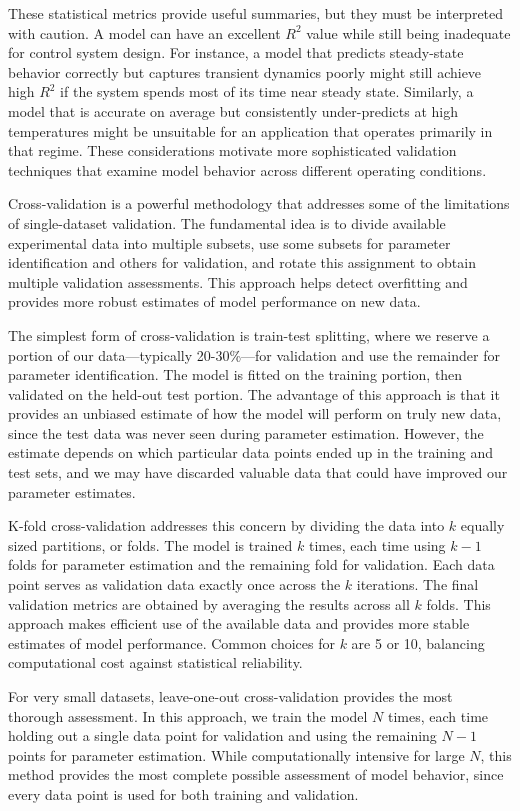 These statistical metrics provide useful summaries, but they must be interpreted with caution. A model can have an excellent $R^2$ value while still being inadequate for control system design. For instance, a model that predicts steady-state behavior correctly but captures transient dynamics poorly might still achieve high $R^2$ if the system spends most of its time near steady state. Similarly, a model that is accurate on average but consistently under-predicts at high temperatures might be unsuitable for an application that operates primarily in that regime. These considerations motivate more sophisticated validation techniques that examine model behavior across different operating conditions.

Cross-validation is a powerful methodology that addresses some of the limitations of single-dataset validation. The fundamental idea is to divide available experimental data into multiple subsets, use some subsets for parameter identification and others for validation, and rotate this assignment to obtain multiple validation assessments. This approach helps detect overfitting and provides more robust estimates of model performance on new data.

The simplest form of cross-validation is train-test splitting, where we reserve a portion of our data—typically 20-30\%—for validation and use the remainder for parameter identification. The model is fitted on the training portion, then validated on the held-out test portion. The advantage of this approach is that it provides an unbiased estimate of how the model will perform on truly new data, since the test data was never seen during parameter estimation. However, the estimate depends on which particular data points ended up in the training and test sets, and we may have discarded valuable data that could have improved our parameter estimates.

K-fold cross-validation addresses this concern by dividing the data into $k$ equally sized partitions, or folds. The model is trained $k$ times, each time using $k-1$ folds for parameter estimation and the remaining fold for validation. Each data point serves as validation data exactly once across the $k$ iterations. The final validation metrics are obtained by averaging the results across all $k$ folds. This approach makes efficient use of the available data and provides more stable estimates of model performance. Common choices for $k$ are 5 or 10, balancing computational cost against statistical reliability.

For very small datasets, leave-one-out cross-validation provides the most thorough assessment. In this approach, we train the model $N$ times, each time holding out a single data point for validation and using the remaining $N-1$ points for parameter estimation. While computationally intensive for large $N$, this method provides the most complete possible assessment of model behavior, since every data point is used for both training and validation.

